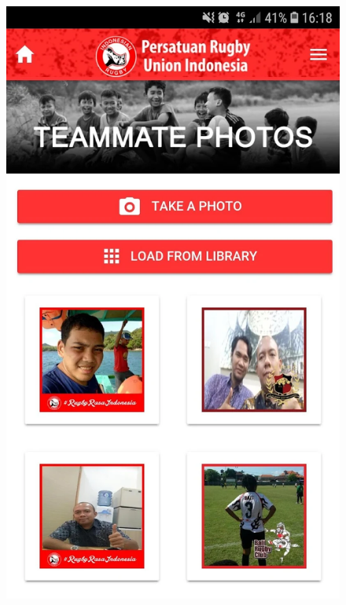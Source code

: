 \documentclass[a4paper,twoside]{article}
\begin{document}
\begin{figure} [!h]
    \includegraphics[scale=0.125]{Images/teammate_photos.png} \hspace{0.5cm}

\end{figure}
\end{document}
